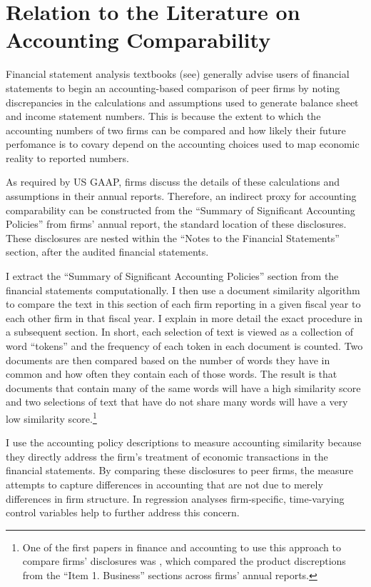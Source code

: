 \documentclass[thesis]{thesis-umich}
\begin{document}
\section{Relation to the Literature on Accounting Comparability} \label{sec:comparability}
Financial statement analysis textbooks (see\cite{healypalepu2007, kolleretal2005}) generally advise users of financial statements to begin an accounting-based comparison of peer firms by noting discrepancies in the calculations and assumptions used to generate balance sheet and income statement numbers. This is because the extent to which the accounting numbers of two firms can be compared and how likely their future perfomance is to covary depend on the accounting choices used to map economic reality to reported numbers. 

As required by US GAAP, firms discuss the details of these calculations and assumptions in their annual reports.
Therefore, an indirect proxy for accounting comparability can be constructed from the ``Summary of Significant Accounting Policies'' from firms' annual report, the standard location of these disclosures. These disclosures are nested within the ``Notes to the Financial Statements'' section, after the audited financial statements. 

I extract the ``Summary of Significant Accounting Policies''  section from the financial statements computationally. I then use a document similarity algorithm to compare the text in this section of each firm reporting in a given fiscal year to each other firm in that fiscal year. I explain in more detail the exact procedure in a subsequent section. In short, each selection of text is viewed as a collection of word ``tokens'' and the frequency of each token in each document is counted. Two documents are then compared based on the number of words they have in common and how often they contain each of those words. The result is that documents that contain many of the same words will have a high similarity score and two selections of text that have do not share many words will have a very low similarity score.\footnote{One of the first papers in finance and accounting to use this approach to compare firms' disclosures was \cite{hobergetal2014}, which compared the product discreptions from the ``Item 1. Business'' sections across firms' annual reports.}

I use the accounting policy descriptions to measure accounting similarity because they directly address the firm's treatment of economic transactions in the financial statements. By comparing these disclosures to peer firms, the measure attempts to capture differences in accounting that are not due to merely differences in firm structure. In regression analyses firm-specific, time-varying control variables help to further address this concern.
\end{document}
